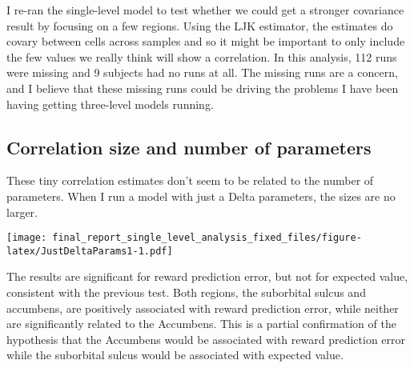 \documentclass[]{article}
\begin{document}
I re-ran the single-level model to test whether we could get a stronger
covariance result by focusing on a few regions. Using the LJK estimator,
the estimates do covary between cells across samples and so it might be
important to only include the few values we really think will show a
correlation. In this analysis, 112 runs were missing and 9 subjects had
no runs at all. The missing runs are a concern, and I believe that these
missing runs could be driving the problems I have been having getting
three-level models running.

\subsection{Correlation size and number of
parameters}\label{correlation-size-and-number-of-parameters}

These tiny correlation estimates don't seem to be related to the number
of parameters. When I run a model with just a Delta parameters, the
sizes are no larger.

\texttt{[image: final\_report\_single\_level\_analysis\_fixed\_files/figure-latex/JustDeltaParams1-1.pdf]}

The results are significant for reward prediction error, but not for
expected value, consistent with the previous test. Both regions, the
suborbital sulcus and accumbens, are positively associated with reward
prediction error, while neither are significantly related to the
Accumbens. This is a partial confirmation of the hypothesis that the
Accumbens would be associated with reward prediction error while the
suborbital sulcus would be associated with expected value.
\end{document}
